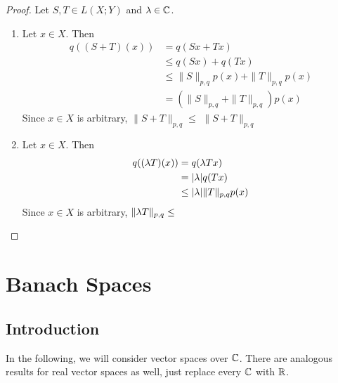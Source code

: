 \documentclass{book}
\begin{document}
\begin{proof}
	Let $S, T \in L(X; Y)$ and $\lambda \in \mathbb{C}$. 
	\begin{enumerate}
		\item Let $x \in X$. Then 
		\begin{align*}
			q((S+T)(x)) 
			& = q(Sx + Tx) \\
			& \leq q(Sx) + q(Tx) \\
			& \leq \|S\|_{p,q}p(x) + \|T\|_{p,q}p(x) \\
			& =  (\|S\|_{p,q} + \|T\|_{p,q}) p(x)
		\end{align*}
		Since $x \in X$ is arbitrary, $\|S+T\|_{p,q} \leq $
		$\|S + T\|_{p,q} $
		\item Let $x \in X$. Then 
		\begin{align*}
			q((\lambda T)(x)) 
			& = q(\lambda Tx) \\
			& = |\lambda| q(Tx) \\
			& \leq |\lambda |\|T\|_{p,q}p(x) \\
		\end{align*}
		Since $x \in X$ is arbitrary, $\|\lambda T\|_{p,q} \leq $
	\end{enumerate}
\end{proof}

 

	
	
	
	
	
	
	
	




	
	
	
	
	
	
	
	
	
	
	
	
	
	
	\newpage
	\chapter{Banach Spaces}

	\section{Introduction}
	\begin{note}
		In the following, we will consider vector spaces over $\mathbb{C}$. There are analogous results for real vector spaces as well, just replace every $\mathbb{C}$ with $\mathbb{R}$.
	\end{note}
	
\end{document}
